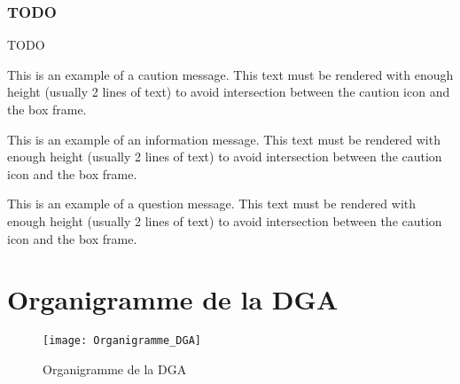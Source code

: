 \documentclass[11pt, book, english, french, standardlists]{upmethodology-document}
\begin{document}
				\subsubsection{TODO}
						TODO
						\begin{upmcaution}
							This is an example of a caution message. This text must be rendered with enough height (usually 2 lines of text) to avoid intersection between the caution icon and the box frame.
						\end{upmcaution}
						\begin{upminfo}
							This is an example of an information message. This text must be rendered with enough height (usually 2 lines of text) to avoid intersection between the caution icon and the box frame.
						\end{upminfo}
						\begin{upmquestion}
							This is an example of a question message. This text must be rendered with enough height (usually 2 lines of text) to avoid intersection between the caution icon and the box frame.
						\end{upmquestion}
	\nocite{*}
	
	
	\printglossary[type=\acronymtype,title=Lexique,toctitle=Lexique]{}
		\setcounter{section}{0}
		\renewcommand{\thesection}{\Alph{section}}
		\renewcommand{\theHsection}{appendixsection.\Alph{section}}
		\section{Organigramme de la DGA}\label{sec:organigrammedga}
			\begin{figure}[H]
				\centering
				\texttt{[image: Organigramme\_DGA]}
				\caption{Organigramme de la DGA\cite{OrganigrammeDGA}}
				\label{fig:Organigramme_DGA}
			\end{figure}
\end{document}
